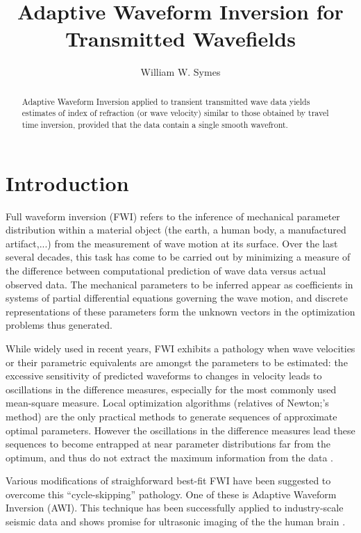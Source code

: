 \title{Adaptive Waveform Inversion for Transmitted Wavefields}
\author{William W. Symes}

\begin{abstract}
Adaptive Waveform Inversion
applied to transient transmitted wave data yields estimates of index of
refraction (or wave velocity) similar to those obtained by travel time
inversion, provided that the data contain a single smooth wavefront.
\end{abstract}

\section{Introduction}
Full waveform inversion (FWI) refers to the inference of mechanical
parameter distribution within a material object  (the earth, a human
body, a manufactured artifact,...) from the measurement of wave motion
at its surface. Over the last several decades, this task has come to
be carried out by minimizing a measure of the difference between computational
prediction of wave data versus actual observed
data. The mechanical parameters to be inferred appear as
coefficients in systems of partial differential equations governing
the wave motion, and discrete representations of these parameters form
the unknown vectors in the optimization problems thus generated.

While widely used in recent years, FWI exhibits a pathology when wave
velocities or their parametric equivalents are amongst the parameters
to be estimated: the excessive sensitivity of predicted waveforms to
changes in velocity leads to oscillations in the difference measures,
especially for the most commonly used mean-square measure. Local
optimization algorithms (relatives of Newton;'s method) are the only practical
methods to generate sequences of approximate optimal
parameters. However the oscillations in the difference measures lead
these sequences to become entrapped at near parameter distributions
far from the optimum, and thus do not extract the maximum information
from the data \cite[]{VirieuxOperto:09}. 

Various modifications of straighforward best-fit FWI have been
suggested to overcome this ``cycle-skipping'' pathology. One of these
is Adaptive Waveform Inversion \cite[]{Warner:16} (AWI). This
technique has been successfully applied to industry-scale seismic data
\cite[]{GuaschWarnerRavaut:GEO19,Warneretal:SEG21} and shows promise for
ultrasonic imaging of the the human brain
\cite[]{Guaschetal:NPJDM20}.

